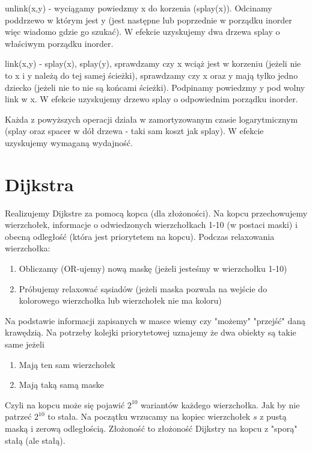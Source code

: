 \documentclass[a4paper,12pt]{article}
\begin{document}
unlink(x,y) - wyciągamy powiedzmy x do korzenia (splay(x)). Odcinamy poddrzewo w którym jest y (jest następne lub poprzednie w porządku inorder więc wiadomo gdzie go szukać). W efekcie uzyskujemy dwa drzewa splay o właściwym porządku inorder.

link(x,y) - splay(x), splay(y), sprawdzamy czy x wciąż jest w korzeniu (jeżeli nie to x i y należą do tej samej ścieżki), sprawdzamy czy x oraz y mają tylko jedno dziecko (jeżeli nie to nie są końcami ścieżki). Podpinamy powiedzmy y pod wolny link w x. W efekcie uzyskujemy drzewo splay o odpowiednim porządku inorder.

Każda z powyższych operacji działa w zamortyzowanym czasie logarytmicznym (splay oraz spacer w dół drzewa -  taki sam koszt jak splay). W efekcie uzyskujemy wymaganą wydajność.
\section{Dijkstra}
Realizujemy Dijkstre za pomocą kopca (dla złożoności). Na kopcu przechowujemy wierzchołek, informacje o odwiedzonych wierzchołkach 1-10 (w postaci maski) i obecną odległość (która jest priorytetem na kopcu). Podczas relaxowania wierzchołka:
\begin{enumerate}
 \item Obliczamy (OR-ujemy) nową maskę (jeżeli jesteśmy w wierzchołku 1-10)
 \item Próbujemy relaxować sąsiadów (jeżeli maska pozwala na wejście do kolorowego wierzchołka lub wierzchołek nie ma koloru)
\end{enumerate}
Na podstawie informacji zapisanych w masce wiemy czy "możemy" "przejść" daną krawędzią. Na potrzeby kolejki priorytetowej uznajemy że dwa obiekty są takie same jeżeli
\begin{enumerate}
 \item Mają ten sam wierzchołek
 \item Mają taką samą maske
\end{enumerate}
Czyli na kopcu może się pojawić $2^{10}$ wariantów każdego wierzchołka. Jak by nie patrzeć $2^{10}$ to stała.
Na początku wrzucamy na kopiec wierzchołek $s$ z pustą maską i zerową odległością. Złożoność to złożoność Dijkstry na kopcu z "sporą" stałą (ale stałą).
\section{}
\section{}
\end{document}
